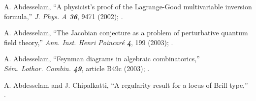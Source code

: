 




 A. Abdesselam,
    ``A physicist's proof of the Lagrange-Good
      multivariable inversion formula,''
    {\em J. Phys. A \bf  36}, 9471 (2002); %
    .

 A. Abdesselam,
    {``The Jacobian conjecture as a problem
    of perturbative quantum field theory,''}
    {\em Ann. Inst. Henri Poincar{\'e}  \bf 4}, 199 (2003); %
    .

 A. Abdesselam,
    {``Feynman diagrams in algebraic combinatorics,''}
    \\
    {\em S\'em. Lothar. Combin. \bf 49}, article B49c (2003);
        .

 A. Abdesselam and J. Chipalkatti,
    {``A regularity result for a locus of Brill type,''}
        .

